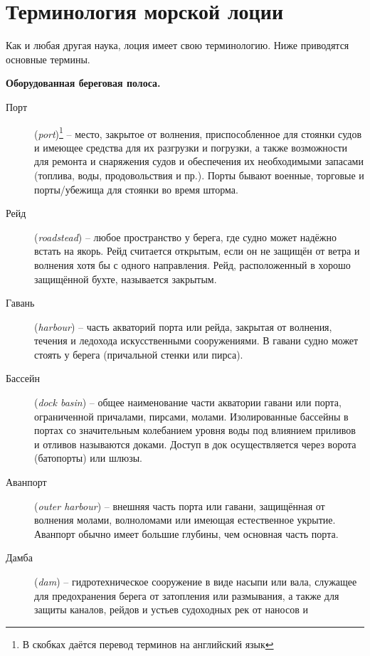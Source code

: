 \section{Терминология морской лоции}

Как и любая другая наука, лоция имеет свою терминологию. Ниже
приводятся основные термины.

\textbf{Оборудованная береговая полоса.}

\begin{description}
\item [Порт] (\textit{port})\footnote{В
    скобках даётся перевод терминов на английский язык} \--- место,
  закрытое от волнения, приспособленное для стоянки судов и имеющее
  средства для их разгрузки и погрузки, а также возможности для
  ремонта и снаряжения судов и обеспечения их необходимыми запасами
  (топлива, воды, продовольствия и пр.). Порты бывают военные,
  торговые и порты\-/убежища для стоянки во время шторма.
\item [Рейд] (\textit{roadstead}) \---
  любое пространство у берега, где судно может надёжно встать на
  якорь. Рейд считается открытым, если он не защищён от ветра и
  волнения хотя бы с одного направления. Рейд, расположенный в хорошо
  защищённой бухте, называется закрытым.
\item [Гавань] (\textit{harbour}) \---
часть акваторий порта или рейда, закрытая от волнения, течения и
ледохода искусственными сооружениями. В гавани судно может стоять у
берега (причальной стенки или пирса).
\item [Бассейн] (\textit{dock basin})
  \--- общее наименование части акватории гавани или порта,
  ограниченной причалами, пирсами, молами. Изолированные бассейны в
  портах со значительным колебанием уровня воды под влиянием приливов
  и отливов называются доками. Доступ в док осуществляется через
  ворота (батопорты) или шлюзы.
\item [Аванпорт] (\textit{outer harbour})
  \--- внешняя часть порта или гавани, защищённая от
  волнения молами, волноломами или имеющая естественное
  укрытие. Аванпорт обычно имеет большие глубины, чем основная часть
  порта.
\item [Дамба] (\textit{dam}) \---
  гидротехническое сооружение в виде насыпи или вала, служащее для
  предохранения берега от затопления или размывания, а также для
  защиты каналов, рейдов и устьев судоходных рек от наносов и

\end{description}

